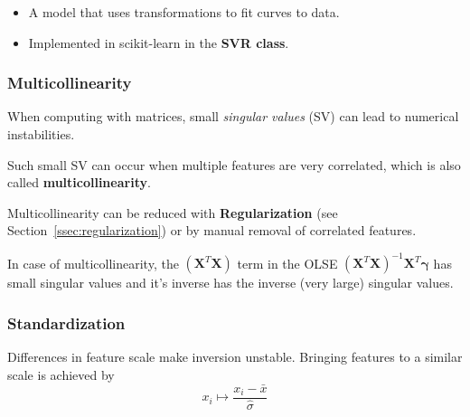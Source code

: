 \begin{itemize}
    \item A model that uses transformations to fit curves to data.
    \item Implemented in scikit-learn in the \textbf{SVR class}.
\end{itemize}


\subsubsection{Multicollinearity}
When computing with matrices, small \textit{singular values} (SV) can lead to numerical instabilities.

Such small SV can occur when multiple features are very correlated, which is also called \textbf{multicollinearity}.

Multicollinearity can be reduced with \textbf{Regularization} (see Section\ \ref{ssec:regularization}) or by manual removal of correlated features.

\newpar{}

In case of multicollinearity, the $(\mathbf{X}^T \mathbf{X})$ term in the OLSE ${(\mathbf{X}^T \mathbf{X})}^{-1}\mathbf{X}^T\boldsymbol{\gamma}$ has small singular values and it's inverse has the inverse (very large) singular values.

\subsubsection{Standardization}
Differences in feature scale make inversion unstable. Bringing features to a similar scale is achieved by
\noindent\begin{equation*}
    x_i\mapsto\frac{x_i-\bar{x}}{\widehat{\sigma}}
\end{equation*}
